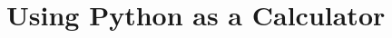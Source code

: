 \begin{comment}
\section{Hmm, the margins seem big? Especially on the left of the page?}
Yeah, that's okay. This is done by design as your thesis will be printed and bound on one side, so you need extra room on the left so the text doesn't fall into the bind on your page.

The margins used in this template are the standards for postgraduate research theses, which are also applicable for undergraduate theses too. The reason for the large margins and big spacing is so those marking your work can write in notes and red-pen your thesis easily. So yeah, don't worry about it!

\cleardoublepage
\end{comment}

\section{Using Python as a Calculator}

